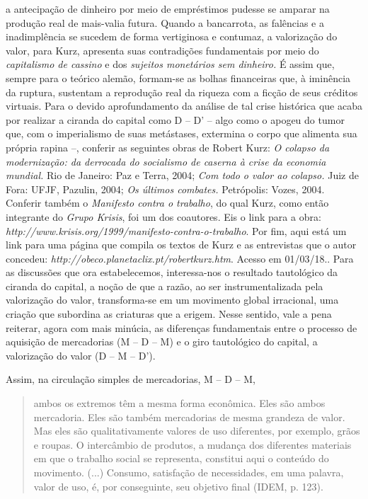 {  a antecipação de dinheiro por meio de empréstimos pudesse se amparar
  na produção real de mais-valia futura. Quando a bancarrota, as
  falências e a inadimplência se sucedem de forma vertiginosa e
  contumaz, a valorização do valor, para Kurz, apresenta suas
  contradições fundamentais por meio do \emph{capitalismo de cassino} e
  dos \emph{sujeitos monetários sem dinheiro.} É assim que, sempre para
  o teórico alemão, formam-se as bolhas financeiras que, à iminência da
  ruptura, sustentam a reprodução real da riqueza com a ficção de seus
  créditos virtuais. Para o devido aprofundamento da análise de tal
  crise histórica que acaba por realizar a ciranda do capital como D --
  D' -- algo como o apogeu do tumor que, com o imperialismo de suas
  metástases, extermina o corpo que alimenta sua própria rapina --,
  conferir as seguintes obras de Robert Kurz: \emph{O colapso da
  modernização: da derrocada do socialismo de caserna à crise da
  economia mundial.} Rio de Janeiro: Paz e Terra, 2004; \emph{Com todo o
  valor ao colapso.} Juiz de Fora: UFJF, Pazulin, 2004; \emph{Os últimos
  combates.} Petrópolis: Vozes, 2004. Conferir também o \emph{Manifesto
  contra o trabalho}, do qual Kurz, como então integrante do \emph{Grupo
  Krisis}, foi um dos coautores. Eis o link para a obra:
  \emph{http://www.krisis.org/1999/manifesto-contra-o-trabalho}.
  Por fim, aqui está um link para uma página que compila os textos de
  Kurz e as entrevistas que o autor concedeu:
  \emph{http://obeco.planetaclix.pt/robertkurz.htm}.
  Acesso em 01/03/18.}. Para as discussões que ora estabelecemos,
interessa-nos o resultado tautológico da ciranda do capital, a noção de
que a razão, ao ser instrumentalizada pela valorização do valor,
transforma-se em um movimento global irracional, uma criação que
subordina as criaturas que a erigem. Nesse sentido, vale a pena
reiterar, agora com mais minúcia, as diferenças fundamentais entre o
processo de aquisição de mercadorias (M -- D -- M) e o giro tautológico
do capital, a valorização do valor (D -- M -- D').

Assim, na circulação simples de mercadorias, M -- D -- M,

\begin{quote}
ambos os extremos têm a mesma forma econômica. Eles são ambos
mercadoria. Eles são também mercadorias de mesma grandeza de valor. Mas
eles são qualitativamente valores de uso diferentes, por exemplo, grãos
e roupas. O intercâmbio de produtos, a mudança dos diferentes materiais
em que o trabalho social se representa, constitui aqui o conteúdo do
movimento. (...) Consumo, satisfação de necessidades, em uma palavra,
valor de uso, é, por conseguinte, seu objetivo final (IDEM, p. 123).
\end{quote}

